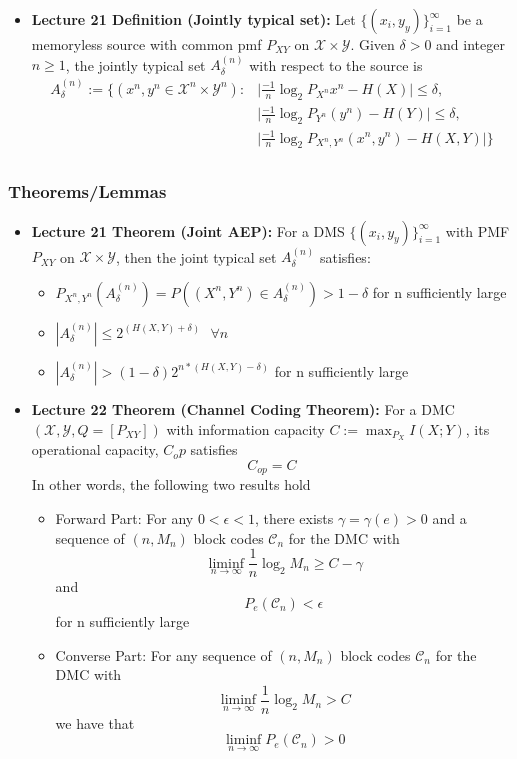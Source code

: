 \documentclass{article}
\begin{document}
\begin{itemize}
    \item \textbf{Lecture 21 Definition (Jointly typical set): }
    Let \(\{(x_i, y_y)\}_{i=1}^\infty\) be a memoryless source with common pmf \(P_{XY}\) on \(\mathcal{X} \times \mathcal{Y}\). Given \(\delta>0\) and integer \(n\geq 1\), the jointly typical set \(A^{(n)}_\delta\) with respect to the source is
    \begin{align*}
        A^{(n)}_\delta := \{ (x^n, y^n \in \mathcal{X}^n \times \mathcal{Y}^n) :& \big|\frac{-1}{n} \log_2 P_{X^n} x^n - H(X)\big| \leq \delta, \\
        & \big|\frac{-1}{n} \log_2 P_{Y^n}(y^n) - H(Y)\big| \leq \delta, \\
        & \big|\frac{-1}{n} \log_2 P_{X^n, Y^n} (x^n, y^n) - H(X,Y)\big|\} \\
    \end{align*}
\end{itemize}
\subsubsection{Theorems/Lemmas}
\begin{itemize}
    \item \textbf{Lecture 21 Theorem (Joint AEP):}
    For a DMS \(\{(x_i, y_y)\}_{i=1}^\infty\) with PMF \(P_{XY}\) on \(\mathcal{X} \times \mathcal{Y}\), then the joint typical set \(A^{(n)}_\delta\) satisfies:
    \begin{itemize}
        \item \(P_{X^n,Y^n} (A^{(n)}_\delta) = P((X^n, Y^n) \in A^{(n)}_\delta)> 1 - \delta\) for n sufficiently large
        \item \(|A^{(n)}_\delta| \leq 2^{(H(X,Y) + \delta)} \ \ \ \forall n\)
        \item \(|A^{(n)}_\delta| > (1-\delta) 2^{n*(H(X,Y) - \delta)}\) for n sufficiently large
    \end{itemize}
    \item \textbf{Lecture 22 Theorem (Channel Coding Theorem): }
    For a DMC \((\mathcal{X}, \mathcal{Y}, Q = [P_{XY}])\) with information capacity \(C:= \max_{P_X} I(X;Y)\), its operational capacity, \(C_op\) satisfies
    \[C_{op} = C\]
    In other words, the following two results hold
    \begin{itemize}
        \item Forward Part: For any \(0< \epsilon<1\), there exists \(\gamma = \gamma(e)>0\) and a sequence of \((n,M_n)\) block codes \(\mathcal{C}_n\) for the DMC with
        \[\liminf_{n \to \infty} \frac{1}{n} \log_2 M_n \geq C - \gamma\]
        and
        \[P_e(\mathcal{C}_n)< \epsilon\]
        for n sufficiently large
        \item Converse Part: For any sequence of \((n, M_n)\) block codes \(\mathcal{C}_n\) for the DMC with
        \[\liminf_{n \to \infty} \frac{1}{n} \log_2 M_n > C\]
        we have that 
        \[\liminf_{n \to \infty} P_e(\mathcal{C}_n)>0\]
    \end{itemize}
\end{itemize}
\end{document}
